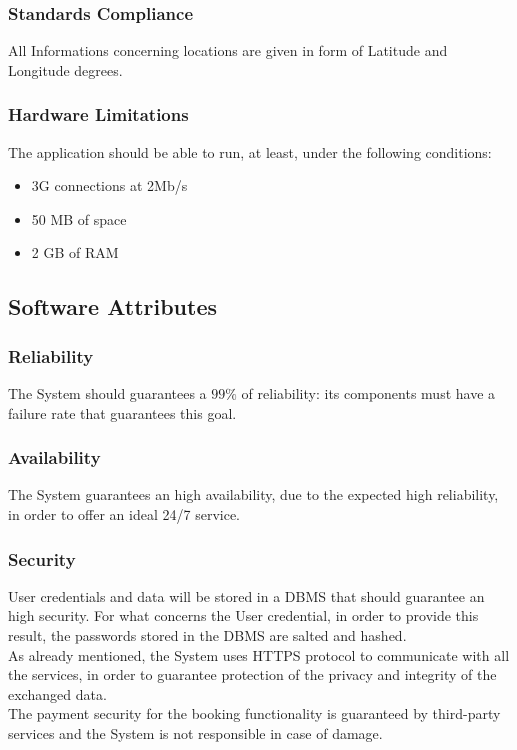 \subsubsection{Standards Compliance}
All Informations concerning locations are given in form of Latitude and Longitude degrees. 

\subsubsection{Hardware Limitations}
The application should be able to run, at least, under the following conditions:
\begin{itemize}
	\item 3G connections at 2Mb/s
	\item 50 MB of space
	\item 2 GB of RAM
\end{itemize}

\subsection{Software Attributes}

\subsubsection{Reliability}
The System should guarantees a $99\%$ of reliability: its components must have a failure rate that guarantees this goal.

\subsubsection{Availability}
The System guarantees an high availability, due to the expected high reliability, in order to offer an ideal 24/7 service.

\subsubsection{Security}
User credentials and data will be stored in a DBMS that should guarantee an high security. For what concerns the User credential, in order to provide this result, the passwords stored in the DBMS are salted and hashed.\\
As already mentioned, the System uses HTTPS protocol to communicate with all the services, in order to guarantee protection of the privacy and integrity of the exchanged data.\\
The payment security for the booking functionality is guaranteed by third-party services and the System is not responsible in case of damage. 

